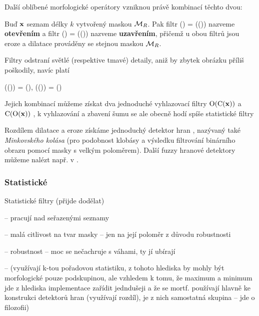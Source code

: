         Další oblíbené morfologické operátory vzniknou právě kombinací těchto dvou:
        
        \begin{define}\label{de eroze dilatace}
          Buď $\mathbf{x}$ seznam délky $k$ vytvořený maskou $\mathcal{M}_R$. Pak filtr
          \beq
          \OO(\xx) = \DD(\EE(\xx))
          \eeq
          nazveme \textbf{otevřením} a filtr
          \beq
          \CC(\xx) = \EE(\DD(\xx))
          \eeq
          nazveme \textbf{uzavřením}, přičemž u obou filtrů jsou eroze a dilatace prováděny se stejnou maskou $\mathcal{M}_R$.
        \end{define}
        
        Filtry odstraní světlé (respektive tmavé) detaily, aniž by zbytek obrázku příliš poškodily, navíc platí 
        
        \beq
        \OO(\OO(\xx)) = \OO(\xx), \quad \CC(\CC(\xx)) = \CC(\xx)
        \eeq
        
        Jejich kombinací můžeme získat dva jednoduché vyhlazovací filtry $\mathrm{O}(\mathrm{C}(\mathbf{x}))$ a $\mathrm{C}(\mathrm{O}(\mathbf{x}))$ , k vyhlazování a zbavení šumu se ale obecně hodí spíše statistické filtry
        
        Rozdílem dilatace a eroze získáme jednoduchý detektor hran , nazývaný také \emph{Minkovského kolása} (pro podobnost klobásy a výsledku filtrování binárního obrazu pomocí masky s velkým poloměrem). Další fuzzy hranové detektory můžeme nalézt např. v \cite{Bělíček}.
        
        \subsubsection{Statistické}
        
        Statistické filtry (přijde dodělat)
        
        -- pracují nad seřazenými seznamy
        
        -- malá citlivost na tvar masky -- jen na její poloměr z důvodu robustnosti
        
        -- robustnost -- moc se nečachruje s váhami, ty jí ubírají
        
        -- (využívají k-tou pořadovou statistiku, z tohoto hlediska by mohly být morfologické pouze podskupinou, ale vzhledem k tomu, že maximum a minimum jde z hlediska implementace zařídit jedndušeji a že se mortf. používají hlavně ke konstrukci detektorů hran (využívají rozdíl), je z nich samostatná skupina -- jde o filozofii)
        
